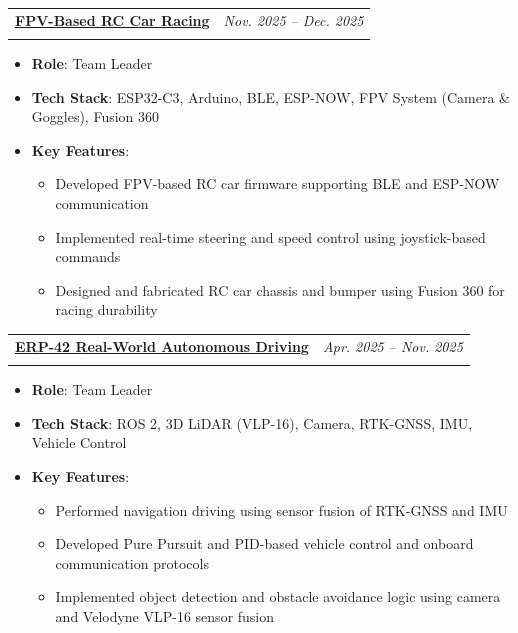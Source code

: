 \documentclass[a4paper,11pt]{article}
\makeatletter
\newcommand{\resumeProject}[4]{%
\item
    \begin{tabularx}{0.98\textwidth}[t]{@{}X>{\raggedleft\arraybackslash}p{4.1cm}@{}}
        \textbf{#1} & \textit{\footnotesize{#3}} \\
        \footnotesize{\textit{#2}} \if\relax\detokenize{#4}\relax\else\newline\footnotesize{#4}\fi &
    \end{tabularx}
}
\newcommand{\resumeItemListStart}{\begin{itemize}}
\newcommand{\resumeItemListEnd}{\end{itemize}}
\makeatother
\begin{document}
\vspace{0.5em}

\resumeProject
{\href{https://github.com/EliseEgkart/iPBL_FPV_car_project}{FPV-Based RC Car Racing}}
{}
{Nov. 2025 -- Dec. 2025}
{}
\vspace{-1.5em}
\resumeItemListStart
  \item \textbf{Role}: Team Leader
  \item \textbf{Tech Stack}: ESP32-C3, Arduino, BLE, ESP-NOW, FPV System (Camera \& Goggles), Fusion 360
  \item \textbf{Key Features}:
  \begin{itemize}[leftmargin=1.2em]
    \item Developed FPV-based RC car firmware supporting BLE and ESP-NOW communication
    \item Implemented real-time steering and speed control using joystick-based commands
    \item Designed and fabricated RC car chassis and bumper using Fusion 360 for racing durability
  \end{itemize}
\resumeItemListEnd

\vspace{0.5em}

\resumeProject
{\href{https://github.com/UNITA2025}{ERP-42 Real-World Autonomous Driving}}
{}
{Apr. 2025 -- Nov. 2025}
{}
\vspace{-1.5em}
\resumeItemListStart
  \item \textbf{Role}: Team Leader
  \item \textbf{Tech Stack}: ROS 2, 3D LiDAR (VLP-16), Camera, RTK-GNSS, IMU, Vehicle Control
  \item \textbf{Key Features}:
  \begin{itemize}[leftmargin=1.2em]
    \item Performed navigation driving using sensor fusion of RTK-GNSS and IMU
    \item Developed Pure Pursuit and PID-based vehicle control and onboard communication protocols
    \item Implemented object detection and obstacle avoidance logic using camera and Velodyne VLP-16 sensor fusion
  \end{itemize}
\resumeItemListEnd

\vspace{0.5em}
\end{document}
